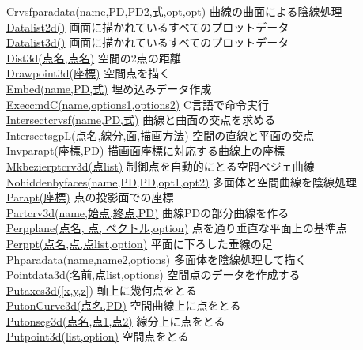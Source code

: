 \documentclass[papersize,a4paper,12pt,uplatex]{jsarticle}
\begin{document}
\begin{tabbing}
\hyperlink{crvsfparadata}{Crvsfparadata(name,PD,PD2,式,opt,opt)}  \>曲線の曲面による陰線処理\\
\hyperlink{datalist}{Datalist2d()}  \>画面に描かれているすべてのプロットデータ\\
\hyperlink{datalist}{Datalist3d()}  \>画面に描かれているすべてのプロットデータ\\
\hyperlink{dist3d}{Dist3d(点名,点名)}  \>空間の2点の距離\\
\hyperlink{drawpoint3d}{Drawpoint3d(座標)}  \>空間点を描く\\
\hyperlink{embed}{Embed(name,PD,式)}  \>埋め込みデータ作成\\
\hyperlink{execcmdc}{ExeccmdC(name,options1,options2)}  \>C言語で命令実行\\
\hyperlink{intersectcrvsf}{Intersectcrvsf(name,PD,式)}  \>曲線と曲面の交点を求める\\
\hyperlink{intersectsgpL}{IntersectsgpL(点名,線分,面,描画方法)}  \>空間の直線と平面の交点\\
\hyperlink{invparapt}{Invparapt(座標,PD)}  \>描画面座標に対応する曲線上の座標\\
\hyperlink{mkbezierptcrv3d}{Mkbezierptcrv3d(点list)}  \>制御点を自動的にとる空間ベジェ曲線\\
\hyperlink{nohiddenbyfaces}{Nohiddenbyfaces(name,PD,PD,opt1,opt2)}  \>多面体と空間曲線を陰線処理\\
\hyperlink{parapt}{Parapt(座標)}  \>点の投影面での座標\\
\hyperlink{partcrv3d}{Partcrv3d(name,始点,終点,PD)}  \>曲線PDの部分曲線を作る\\
\hyperlink{perpplane}{Perpplane(点名, 点, ベクトル,option)}  \>点を通り垂直な平面上の基準点\\
\hyperlink{perppt}{Perppt(点名,点,点list,option)}  \>平面に下ろした垂線の足\\
\hyperlink{phparadata}{Phparadata(name,name2,options)}  \>多面体を陰線処理して描く\\
\hyperlink{pointdata3d}{Pointdata3d(名前,点list,options)} \>空間点のデータを作成する\\
\hyperlink{putaxes3d}{Putaxes3d([x,y,z])}  \>軸上に幾何点をとる\\
\hyperlink{putonCurve3d}{PutonCurve3d(点名,PD)}  \>空間曲線上に点をとる\\
\hyperlink{putonseg3d}{Putonseg3d(点名,点1,点2)}  \>線分上に点をとる\\
\hyperlink{putpoint3d}{Putpoint3d(list,option)}  \>空間点をとる\\

\end{tabbing}
\end{document}
